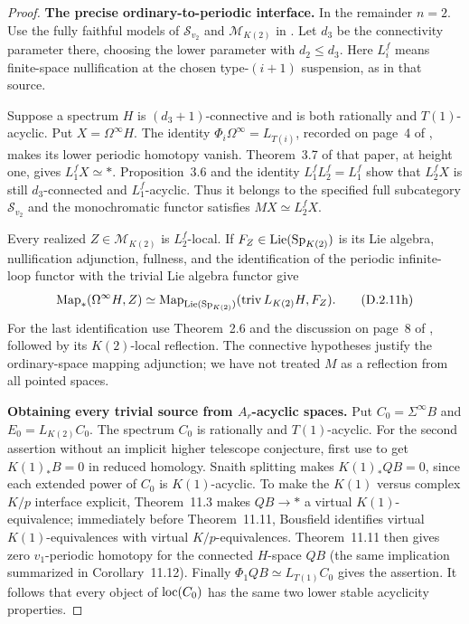 \begin{proof}
\medskip\noindent
\textbf{The precise ordinary-to-periodic interface.}
In the remainder $n=2$. Use the fully faithful models of
$\mathcal S_{v_2}$ and $\mathcal M_{K(2)}$ in
\cite[Definition~3.11, Corollary~2.8 and Proposition~4.26]
{I_Heuts2021}. Let $d_3$ be the connectivity parameter there,
choosing the lower parameter with $d_2\leq d_3$.
Here $L_i^f$ means finite-space nullification at the chosen
type-$(i+1)$ suspension, as in that source.

Suppose a spectrum $H$ is $(d_3+1)$-connective and is both
rationally and $T(1)$-acyclic. Put $X=\Omega^\infty H$.
The identity $\Phi_i\Omega^\infty=L_{T(i)}$, recorded on
page~4 of \citet{I_Heuts2021}, makes its lower periodic
homotopy vanish. Theorem~3.7 of that paper, at height one,
gives $L_1^fX\simeq *$. Proposition~3.6 and the identity
$L_1^fL_2^f=L_1^f$ show that $L_2^fX$ is still
$d_3$-connected and $L_1^f$-acyclic. Thus it belongs to the
specified full subcategory $\mathcal S_{v_2}$ and the
monochromatic functor satisfies $MX\simeq L_2^fX$.

Every realized $Z\in\mathcal M_{K(2)}$ is $L_2^f$-local.
If $F_Z\in\operatorname{Lie}(\mathrm{Sp}_{K(2)})$ is its Lie
algebra, nullification adjunction, fullness, and the
identification of the periodic infinite-loop functor with
the trivial Lie algebra functor give
\[
 \operatorname{Map}_*(\Omega^\infty H,Z)
 \simeq
 \operatorname{Map}_{\operatorname{Lie}(\mathrm{Sp}_{K(2)})}
       (\operatorname{triv}L_{K(2)}H,F_Z).
 \tag{D.2.11h}
\]
For the last identification use Theorem~2.6 and the discussion
on page~8 of \citet{I_Heuts2021}, followed by its
$K(2)$-local reflection. The connective hypotheses justify
the ordinary-space mapping adjunction; we have not treated
$M$ as a reflection from all pointed spaces.

\medskip\noindent
\textbf{Obtaining every trivial source from $A_r$-acyclic spaces.}
Put $C_0=\Sigma^\infty B$ and $E_0=L_{K(2)}C_0$.
The spectrum $C_0$ is rationally and $T(1)$-acyclic. For
the second assertion without an implicit higher telescope
conjecture, first use
\cite[Section~10.11]{EH5Bousfield1997} to get
$K(1)_*B=0$ in reduced homology. Snaith splitting makes
$K(1)_*QB=0$, since each extended power of $C_0$ is
$K(1)$-acyclic. To make the $K(1)$ versus complex $K/p$
interface explicit, Theorem~11.3 makes $QB\to *$ a virtual
$K(1)$-equivalence; immediately before Theorem~11.11,
Bousfield identifies virtual $K(1)$-equivalences with virtual
$K/p$-equivalences. Theorem~11.11 then gives zero
$v_1$-periodic homotopy for the connected $H$-space $QB$
(the same implication summarized in Corollary~11.12).
Finally $\Phi_1QB\simeq L_{T(1)}C_0$ gives the assertion.
It follows that every object of $\operatorname{loc}(C_0)$ has the same
two lower stable acyclicity properties.


\end{proof}
